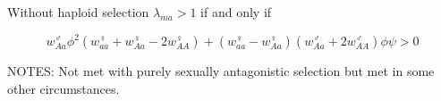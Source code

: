 \documentclass[12pt]{article}
\begin{document}
Without haploid selection $\lambda_{ma}>1$ if and only if

\begin{equation}
w_{Aa}^\male \phi^2(w_{aa}^\female + w_{Aa}^\female-2w_{AA}^\female) + (w_{aa}^\female-w_{Aa}^\female)(w_{Aa}^\male+2w_{AA}^\male) \phi \psi >0
\end{equation}

\noindent
NOTES: Not met with purely sexually antagonistic selection but met in some other circumstances. 


\end{document}
